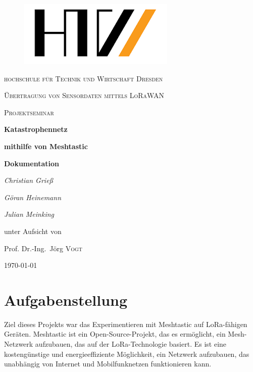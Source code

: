\documentclass[12pt,a4paper]{article}
\author{Christian Grieß}
\begin{document}
\begin{titlepage}
\begin{figure}
	\centering \includegraphics[scale=1]{HTW_LOGO.png}
\end{figure}

	
	\centering
	{\scshape\LARGE hochschule für Technik und Wirtschaft Dresden \par}
	\vspace{2cm}
	{\scshape\Large Übertragung von Sensordaten mittels LoRaWAN\par}
	\vspace{0cm}
	{\scshape\Large Projektseminar \par}
	\vspace{1.5cm}
	{\huge\bfseries Katastrophennetz\par}
	{\huge\bfseries mithilfe von Meshtastic\par}
	\vspace{1.5cm}
	{\huge\bfseries {Dokumentation}\par}	
	\vspace{4cm}
	{\Large\itshape Christian Grieß\par}
	{\Large\itshape Göran Heinemann\par}
	{\Large\itshape Julian Meinking\par}
	\vfill
	unter Aufsicht von\par %
	Prof. Dr.-Ing.~Jörg \textsc{Vogt}

	\vfill

	{\large \today\par}
\end{titlepage}
\newpage
\tableofcontents

\newpage
\section{Aufgabenstellung}

Ziel dieses Projekts war das Experimentieren mit Meshtastic auf LoRa-fähigen Geräten.
Meshtastic ist ein Open-Source-Projekt, das es ermöglicht, ein Mesh-Netzwerk aufzubauen, das auf der LoRa-Technologie basiert. Es ist eine kostengünstige und energieeffiziente Möglichkeit, ein Netzwerk aufzubauen, das unabhängig von Internet und Mobilfunknetzen funktionieren kann.
\end{document}
